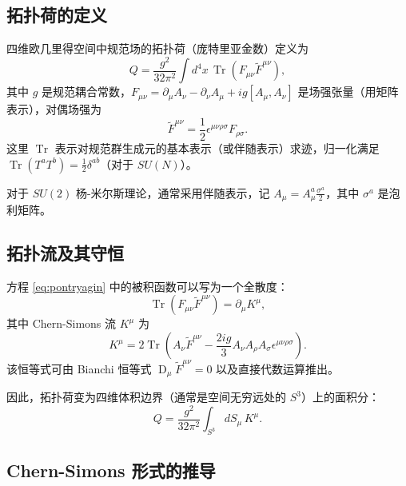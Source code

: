 \subsection*{拓扑荷的定义}

四维欧几里得空间中规范场的拓扑荷（庞特里亚金数）定义为
\begin{equation}
Q = \frac{g^2}{32\pi^2} \int d^4x \, \operatorname{Tr} \left( F_{\mu\nu} \tilde{F}^{\mu\nu} \right),
\label{eq:pontryagin}
\end{equation}
其中 \(g\) 是规范耦合常数，\(F_{\mu\nu} = \partial_\mu A_\nu - \partial_\nu A_\mu + ig [A_\mu, A_\nu]\) 是场强张量（用矩阵表示），对偶场强为
\begin{equation}
\tilde{F}^{\mu\nu} = \frac{1}{2} \epsilon^{\mu\nu\rho\sigma} F_{\rho\sigma}.
\end{equation}
这里 \(\operatorname{Tr}\) 表示对规范群生成元的基本表示（或伴随表示）求迹，归一化满足 \(\operatorname{Tr}(T^a T^b) = \frac{1}{2} \delta^{ab}\)（对于 \(SU(N)\)）。

对于 \(SU(2)\) 杨-米尔斯理论，通常采用伴随表示，记 \(A_\mu = A_\mu^a \frac{\sigma^a}{2}\)，其中 \(\sigma^a\) 是泡利矩阵。

\subsection*{拓扑流及其守恒}

方程 \eqref{eq:pontryagin} 中的被积函数可以写为一个全散度：
\begin{equation}
\operatorname{Tr} \left( F_{\mu\nu} \tilde{F}^{\mu\nu} \right) = \partial_\mu K^\mu,
\end{equation}
其中 Chern-Simons 流 \(K^\mu\) 为
\begin{equation}
K^\mu = 2 \operatorname{Tr} \left( A_\nu \tilde{F}^{\mu\nu} - \frac{2ig}{3} A_\nu A_\rho A_\sigma \epsilon^{\mu\nu\rho\sigma} \right).
\label{eq:cs_current}
\end{equation}
该恒等式可由 Bianchi 恒等式 \(\operatorname{D}_\mu \tilde{F}^{\mu\nu} = 0\) 以及直接代数运算推出。

因此，拓扑荷变为四维体积边界（通常是空间无穷远处的 \(S^3\)）上的面积分：
\begin{equation}
Q = \frac{g^2}{32\pi^2} \int_{S^3} dS_\mu \, K^\mu.
\label{eq:surface}
\end{equation}

\subsection*{Chern-Simons 形式的推导}


